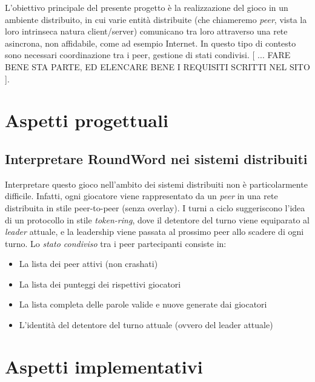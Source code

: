 \documentclass[10.5pt]{article}
\begin{document}
L'obiettivo principale del presente progetto è la realizzazione del gioco in un ambiente distribuito, in cui varie entità distribuite (che chiameremo \emph{peer}, vista la loro intrinseca natura client/server) comunicano tra loro attraverso una rete asincrona, non affidabile, come ad esempio Internet. In questo tipo di contesto sono necessari coordinazione tra i peer, gestione di stati condivisi. [ ... FARE BENE STA PARTE, ED ELENCARE BENE I REQUISITI SCRITTI NEL SITO ].




\section{Aspetti progettuali}

\subsection{Interpretare RoundWord nei sistemi distribuiti}
Interpretare questo gioco nell'ambito dei sistemi distribuiti non è particolarmente difficile. Infatti, ogni giocatore viene rappresentato da un \emph{peer} in una rete distribuita in stile peer-to-peer (senza overlay). I turni a ciclo suggeriscono l'idea di un protocollo in stile \emph{token-ring}, dove il detentore del turno viene equiparato al \emph{leader} attuale, e la leadership viene passata al prossimo peer allo scadere di ogni turno. Lo \emph{stato condiviso} tra i peer partecipanti consiste in:
\begin{itemize}
\item La lista dei peer attivi (non crashati)
\item La lista dei punteggi dei rispettivi giocatori
\item La lista completa delle parole valide e nuove generate dai giocatori
\item L'identità del detentore del turno attuale (ovvero del leader attuale)
\end{itemize}



\section{Aspetti implementativi}
\end{document}
